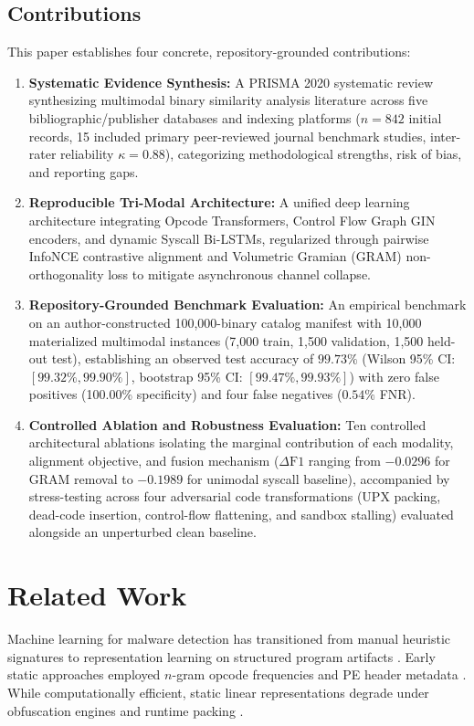 \documentclass[pdflatex,sn-mathphys-num]{sn-jnl}
\begin{document}
\subsection{Contributions}\label{sec:intro_contributions}
This paper establishes four concrete, repository-grounded contributions:
\begin{enumerate}
    \item \textbf{Systematic Evidence Synthesis:} A PRISMA 2020 systematic review synthesizing multimodal binary similarity analysis literature across five bibliographic/publisher databases and indexing platforms ($n = 842$ initial records, 15 included primary peer-reviewed journal benchmark studies, inter-rater reliability $\kappa = 0.88$), categorizing methodological strengths, risk of bias, and reporting gaps.
    \item \textbf{Reproducible Tri-Modal Architecture:} A unified deep learning architecture integrating Opcode Transformers, Control Flow Graph GIN encoders, and dynamic Syscall Bi-LSTMs, regularized through pairwise InfoNCE contrastive alignment and Volumetric Gramian (GRAM) non-orthogonality loss to mitigate asynchronous channel collapse.
    \item \textbf{Repository-Grounded Benchmark Evaluation:} An empirical benchmark on an author-constructed 100,000-binary catalog manifest with 10,000 materialized multimodal instances (7,000 train, 1,500 validation, 1,500 held-out test), establishing an observed test accuracy of $99.73\%$ (Wilson 95\% CI: $[99.32\%, 99.90\%]$, bootstrap 95\% CI: $[99.47\%, 99.93\%]$) with zero false positives (100.00\% specificity) and four false negatives ($0.54\%$ FNR).
    \item \textbf{Controlled Ablation and Robustness Evaluation:} Ten controlled architectural ablations isolating the marginal contribution of each modality, alignment objective, and fusion mechanism ($\Delta\text{F1}$ ranging from $-0.0296$ for GRAM removal to $-0.1989$ for unimodal syscall baseline), accompanied by stress-testing across four adversarial code transformations (UPX packing, dead-code insertion, control-flow flattening, and sandbox stalling) evaluated alongside an unperturbed clean baseline.
\end{enumerate}

\section{Related Work}\label{sec:related_work}
Machine learning for malware detection has transitioned from manual heuristic signatures to representation learning on structured program artifacts \cite{Gibert2020,Shaukat2020}. Early static approaches employed $n$-gram opcode frequencies and PE header metadata \cite{Ni2018,Kim2023Revisiting}. While computationally efficient, static linear representations degrade under obfuscation engines and runtime packing \cite{Borello2014,Fernando2022}.
\end{document}
